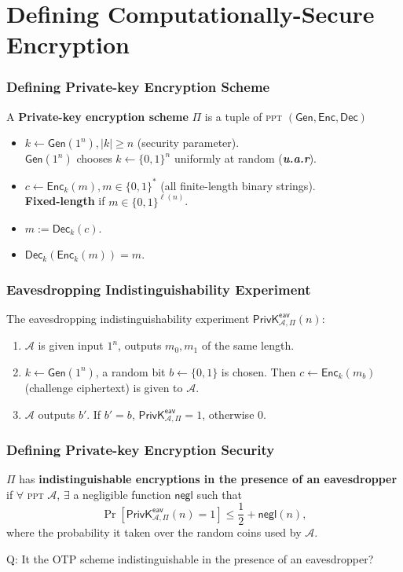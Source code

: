 \section{Defining Computationally-Secure Encryption}
\begin{frame}\frametitle{Defining Private-key Encryption Scheme}
\begin{figure}
\begin{center}

\end{center}
\end{figure}
A \textbf{Private-key encryption scheme} $\Pi$ is a tuple of \textsc{ppt} $(\mathsf{Gen, Enc, Dec})$
\begin{itemize}
\item $k \gets \mathsf{Gen}(1^n), |k|\ge n$ (security parameter). \\
      $\mathsf{Gen}(1^n)$ chooses $k \gets \{0,1\}^n$ uniformly at random (\textbf{\emph{u.a.r}}).
\item $c \gets \mathsf{Enc}_k(m), m \in \{0,1\}^*$ (all finite-length binary strings). \\
      \textbf{Fixed-length} if $m \in \{0,1\}^{\ell(n)}$.
\item $m := \mathsf{Dec}_k(c)$.
\item $\mathsf{Dec}_k(\mathsf{Enc}_k(m)) = m$.
\end{itemize}
\end{frame}
\begin{frame}\frametitle{Eavesdropping Indistinguishability Experiment}
The eavesdropping indistinguishability experiment $\mathsf{PrivK}^{\mathsf{eav}}_{\mathcal{A},\Pi}(n)$:
\begin{enumerate}
	\item $\mathcal{A}$ is given input $1^n$, outputs $m_0, m_1$ of the same length.
	\item $k \gets \mathsf{Gen}(1^n)$, a random bit $b \gets \{0,1\}$ is chosen. Then $c \gets \mathsf{Enc}_k(m_b)$ (challenge ciphertext) is given to $\mathcal{A}$.
	\item $\mathcal{A}$ outputs $b'$. If $b' = b$, $\mathsf{PrivK}^{\mathsf{eav}}_{\mathcal{A},\Pi}=1$, otherwise 0.
\end{enumerate}
\begin{figure}
\begin{center}

\end{center}
\end{figure}
\end{frame}
\begin{frame}\frametitle{Defining Private-key Encryption Security}
\begin{definition}\label{def:ind}
$\Pi$ has \textbf{indistinguishable encryptions in the presence of an eavesdropper} if $\forall$ \textsc{ppt} $\mathcal{A}$, $\exists$ a negligible function $\mathsf{negl}$ such that
\[ \Pr\left[\mathsf{PrivK}^{\mathsf{eav}}_{\mathcal{A},\Pi}(n)=1\right] \le \frac{1}{2} + \mathsf{negl}(n),
\]
where the probability it taken over the random coins used by $\mathcal{A}$.
\end{definition}
\alert{Q: It the OTP scheme indistinguishable in the presence of an eavesdropper?}
\end{frame}
